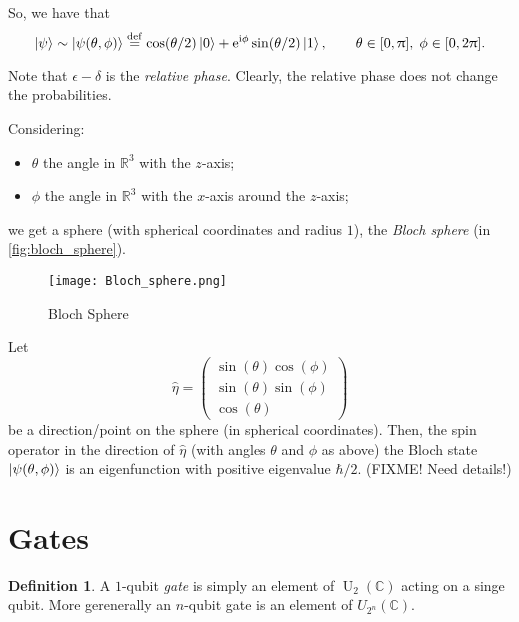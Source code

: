 \documentclass[12pt]{amsart}
\theoremstyle{plain}
\theoremstyle{definition}
\newtheorem{definition}[theorem]{Definition}
\theoremstyle{remarks}
\newcommand{\R}{\mathbb{R}}
\newcommand{\C}{\mathbb{C}}
\newcommand{\me}{\mathrm{e}}
\newcommand{\mi}{\mathrm{i}}
\newcommand{\mpi}{\uppi}
\newcommand{\idef}{\overset{{\rm def}}{=}}
\DeclareMathOperator{\U}{U}  %
\begin{document}
So, we have that
\begin{equation}\label{eq:bloch_coord}
  \ket{\psi} \sim \ket{\psi(\theta, \phi)} \idef \cos(\theta/2) \ket{0} + \me^{\mi \phi} \sin(\theta/2) \ket{1}, \qquad \theta \in [0, \mpi], \; \phi \in [0, 2 \mpi].
\end{equation}

Note that $\epsilon - \delta$ is the \emph{relative phase}.  Clearly, the relative phase does not change the probabilities.

Considering:
\begin{itemize}

\item $\theta$ the angle in $\R^3$ with the $z$-axis;

\item $\phi$ the angle in $\R^3$ with the $x$-axis around the $z$-axis;

\end{itemize}
we get a sphere (with spherical coordinates and radius $1$), the \emph{Bloch sphere} (in \vref{fig:bloch_sphere}).

\begin{figure}\centering

  \texttt{[image: Bloch\_sphere.png]}

  \caption{Bloch Sphere}\label{fig:bloch_sphere}
\end{figure}

Let
\[
  \hat{\eta} = \begin{pmatrix}
    \sin(\theta)\cos(\phi) \\
    \sin(\theta)\sin(\phi) \\
    \cos(\theta)
  \end{pmatrix}
\]
be a direction/point on the sphere (in spherical coordinates).  Then, the spin operator in the direction of $\hat{\eta}$ (with angles $\theta$ and $\phi$ as above) the Bloch state $\ket{\psi(\theta, \phi)}$ is an eigenfunction with positive eigenvalue $\hbar/2$.  (FIXME!  Need details!)


\section{Gates}

\begin{definition}
  A $1$-qubit \emph{gate} is simply an element of $\U_2(\C)$ acting on a singe qubit.  More gerenerally an $n$-qubit gate is an element of $U_{2^n}(\C)$.
\end{definition}
\end{document}
